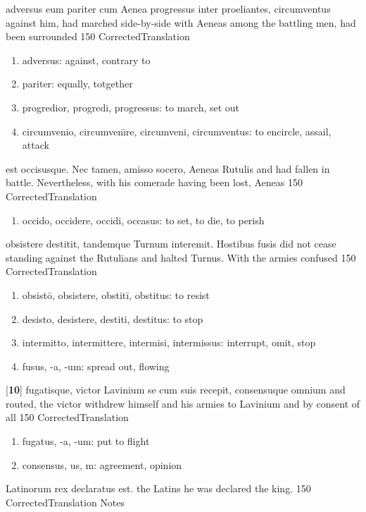 \latline
  {adversus eum pariter cum Aenea progressus inter proeliantes, circumventus}
  { against him, had marched side-by-side with Aeneas among the battling men, had been surrounded }
  {150}
  { CorrectedTranslation }
  { \begin{enumerate}
  	\item adversus:  against, contrary to
  	\item pariter:  equally, totgether
  	\item progredior, progredi, progressus:  to march, set out
  	\item circumvenio, circumven\={\i}re, circumveni, circumventus:  to encircle, assail, attack
  \end{enumerate} }


\latline
  {est occisusque.  Nec tamen, amisso socero, Aeneas Rutulis}
  { and had fallen in battle.  Nevertheless, with his comerade having been lost, Aeneas  }
  {150}
  { CorrectedTranslation }
  { \begin{enumerate}
  	\item occido, occidere, occidi, occasus:  to set, to die, to perish
  \end{enumerate} }


\latline
  {obsistere destitit, tandemque Turnum interemit.  Hostibus fusis}
  { did not cease standing against the Rutulians and halted Turnus.  With the armies confused }
  {150}
  { CorrectedTranslation }
  { \begin{enumerate}
  	\item obsistō, obsistere, obstitī, obstitus:  to resist
  	\item desisto, desistere, destiti, destitus:  to stop
  	\item intermitto, intermittere, intermisi, intermissus:  interrupt, omit, stop
  	\item fusus, -a, -um:  spread out, flowing 
  \end{enumerate} }


\latline
  {[\textbf{10}] fugatisque, victor Lavinium se cum suis recepit, consensuque omnium}
  { and routed, the victor withdrew himself and his armies to Lavinium and by consent of all 	 }
  {150}
  { CorrectedTranslation }
  { \begin{enumerate}
  	\item fugatus, -a, -um: put to flight
  	\item consensus, us, m: agreement, opinion
  \end{enumerate} }


\latline
  {Latinorum rex declaratus est.}
  { the Latins he was declared the king. }
  {150}
  { CorrectedTranslation }
  { Notes }


